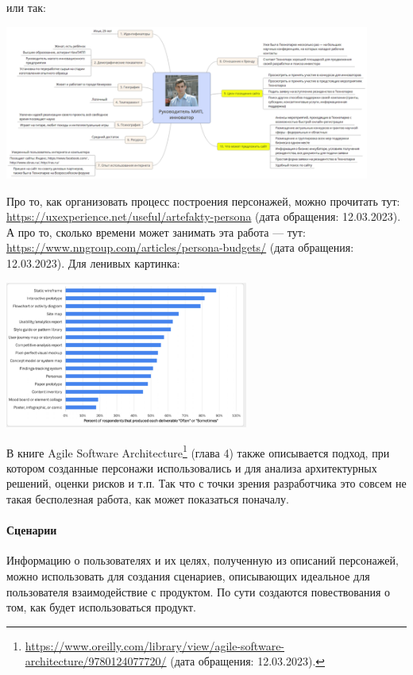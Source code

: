 \documentclass{../../text-style}
\begin{document}
или так:

\begin{center}
    \includegraphics[width=0.9\textwidth]{ilya.png}
\end{center}

Про то, как организовать процесс построения персонажей, можно прочитать тут: \url{https://uxexperience.net/useful/artefakty-persona} (дата обращения: 12.03.2023). А про то, сколько времени может занимать эта работа --- тут: \url{https://www.nngroup.com/articles/persona-budgets/} (дата обращения: 12.03.2023). Для ленивых картинка:

\begin{center}
    \includegraphics[width=0.6\textwidth]{statistics.png}
\end{center}

В книге Agile Software Architecture\footnote{\url{https://www.oreilly.com/library/view/agile-software-architecture/9780124077720/} (дата обращения: 12.03.2023).} (глава 4) также описывается подход, при котором созданные персонажи использовались и для анализа архитектурных решений, оценки рисков и т.п. Так что с точки зрения разработчика это совсем не такая бесполезная работа, как может показаться поначалу.

\paragraph{Сценарии}

Информацию о пользователях и их целях, полученную из описаний персонажей, можно использовать для создания сценариев, описывающих идеальное для пользователя взаимодействие с продуктом. По сути создаются повествования о том, как будет использоваться продукт.
\end{document}
